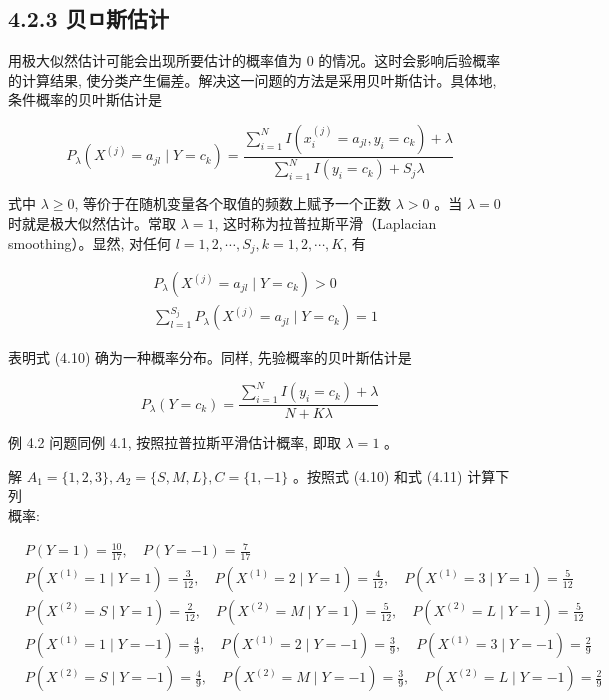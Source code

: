 \documentclass[10pt]{article}
\begin{document}
\subsection*{4.2.3 贝ㅁ斯估计}
用极大似然估计可能会出现所要估计的概率值为 0 的情况。这时会影响后验概率的计算结果, 使分类产生偏差。解决这一问题的方法是采用贝叶斯估计。具体地, 条件概率的贝叶斯估计是


\begin{equation*}
P_{\lambda}\left(X^{(j)}=a_{j l} \mid Y=c_{k}\right)=\frac{\sum_{i=1}^{N} I\left(x_{i}^{(j)}=a_{j l}, y_{i}=c_{k}\right)+\lambda}{\sum_{i=1}^{N} I\left(y_{i}=c_{k}\right)+S_{j} \lambda} \tag{4.10}
\end{equation*}


式中 $\lambda \geqslant 0$, 等价于在随机变量各个取值的频数上赋予一个正数 $\lambda>0$ 。当 $\lambda=0$ 时就是极大似然估计。常取 $\lambda=1$, 这时称为拉普拉斯平滑（Laplacian smoothing）。显然, 对任何 $l=1,2, \cdots, S_{j}, k=1,2, \cdots, K$, 有

$$
\begin{aligned}
& P_{\lambda}\left(X^{(j)}=a_{j l} \mid Y=c_{k}\right)>0 \\
& \sum_{l=1}^{S_{j}} P_{\lambda}\left(X^{(j)}=a_{j l} \mid Y=c_{k}\right)=1
\end{aligned}
$$

表明式 (4.10) 确为一种概率分布。同样, 先验概率的贝叶斯估计是


\begin{equation*}
P_{\lambda}\left(Y=c_{k}\right)=\frac{\sum_{i=1}^{N} I\left(y_{i}=c_{k}\right)+\lambda}{N+K \lambda} \tag{4.11}
\end{equation*}


例 4.2 问题同例 4.1, 按照拉普拉斯平滑估计概率, 即取 $\lambda=1$ 。

解 $A_{1}=\{1,2,3\}, A_{2}=\{S, M, L\}, C=\{1,-1\}$ 。按照式 (4.10) 和式 (4.11) 计算下列\\
概率:

$$
\begin{aligned}
& P(Y=1)=\frac{10}{17}, \quad P(Y=-1)=\frac{7}{17} \\
& P\left(X^{(1)}=1 \mid Y=1\right)=\frac{3}{12}, \quad P\left(X^{(1)}=2 \mid Y=1\right)=\frac{4}{12}, \quad P\left(X^{(1)}=3 \mid Y=1\right)=\frac{5}{12} \\
& P\left(X^{(2)}=S \mid Y=1\right)=\frac{2}{12}, \quad P\left(X^{(2)}=M \mid Y=1\right)=\frac{5}{12}, \quad P\left(X^{(2)}=L \mid Y=1\right)=\frac{5}{12} \\
& P\left(X^{(1)}=1 \mid Y=-1\right)=\frac{4}{9}, \quad P\left(X^{(1)}=2 \mid Y=-1\right)=\frac{3}{9}, \quad P\left(X^{(1)}=3 \mid Y=-1\right)=\frac{2}{9} \\
& P\left(X^{(2)}=S \mid Y=-1\right)=\frac{4}{9}, \quad P\left(X^{(2)}=M \mid Y=-1\right)=\frac{3}{9}, \quad P\left(X^{(2)}=L \mid Y=-1\right)=\frac{2}{9}
\end{aligned}
$$
\end{document}
